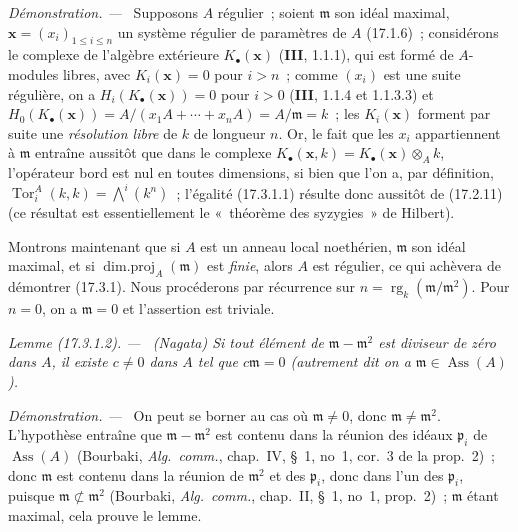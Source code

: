\documentclass[10pt,oneside]{book}
\makeatletter
\newcommand{\setmanualcurrentlabel}[1]{\def\@currentlabel{#1}}
\newcommand{\oldpage}[2][]{%
  \setcounter{footnote}{0}%
  \marginpar{\scriptsize\textbf{#1}~|~#2}\ignorespaces}
\newenvironment{lemma}[1][]{%
  \setmanualcurrentlabel{#1}\par\medskip\noindent\itshape Lemme (#1). ---\ }{\par}
\newenvironment{proof}{%
  \par\medskip\noindent\textit{Démonstration. ---\ }}{\par}
\makeatother
\begin{document}
\begin{proof}
Supposons $A$ régulier~; soient $\mathfrak{m}$ son idéal maximal,
$\mathbf{x}=(x_i)_{1\leq i\leq n}$ un système régulier de paramètres de $A$
(17.1.6)~; considérons le complexe de l'algèbre extérieure
$K_\bullet(\mathbf{x})$ (\textbf{III}, 1.1.1), qui est formé de $A$-modules
libres, avec $K_i(\mathbf{x})=0$ pour $i>n$~; comme $(x_i)$ est une suite
régulière, on a $H_i(K_\bullet(\mathbf{x}))=0$ pour $i>0$ (\textbf{III},
1.1.4 et 1.1.3.3) et
$H_0(K_\bullet(\mathbf{x}))=A/(x_1A+\cdots+x_nA)=A/\mathfrak{m}=k$~; les
$K_i(\mathbf{x})$ forment par suite une \emph{résolution libre} de $k$ de
longueur $n$. Or, le fait que les $x_i$ appartiennent à $\mathfrak{m}$
entraîne aussitôt que dans le complexe
$K_\bullet(\mathbf{x},k)=K_\bullet(\mathbf{x})\otimes_A k$, l'opérateur bord
est nul en toutes dimensions, si bien que l'on a, par définition,
$\operatorname{Tor}^A_i(k,k)=\bigwedge^i(k^n)$~; l'égalité (17.3.1.1) résulte
donc aussitôt de (17.2.11) (ce résultat est essentiellement le «~théorème des
syzygies~» de Hilbert).

Montrons maintenant que si $A$ est un anneau local noethérien,
$\mathfrak{m}$ son idéal maximal, et si
$\operatorname{dim.proj}_A(\mathfrak{m})$ est \emph{finie}, alors $A$ est
régulier, ce qui achèvera de démontrer (17.3.1). Nous procéderons par
récurrence sur $n=\operatorname{rg}_k(\mathfrak{m}/\mathfrak{m}^2)$. Pour
$n=0$, on a $\mathfrak{m}=0$ et l'assertion est triviale.
\end{proof}

\begin{lemma}[17.3.1.2]
\label{0.17.3.1.2-fr}
\textnormal{(Nagata)} Si tout élément de
$\mathfrak{m}-\mathfrak{m}^2$ est diviseur de zéro dans $A$, il existe
$c\neq0$ dans $A$ tel que $c\mathfrak{m}=0$ (autrement dit on a
$\mathfrak{m}\in\operatorname{Ass}(A)$).
\end{lemma}

\begin{proof}
On peut se borner au cas où $\mathfrak{m}\neq0$, donc
$\mathfrak{m}\neq\mathfrak{m}^2$. L'hypothèse entraîne que
$\mathfrak{m}-\mathfrak{m}^2$ est contenu dans la réunion des idéaux
$\mathfrak{p}_i$ de $\operatorname{Ass}(A)$ (Bourbaki,
\emph{Alg.~comm.}, chap.~IV, \S~1, no~1, cor.~3 de la prop.~2)~; donc
$\mathfrak{m}$ est contenu dans la réunion de $\mathfrak{m}^2$
\oldpage[0\textsubscript{IV-1}]{47}
et des $\mathfrak{p}_i$, donc dans l'un des $\mathfrak{p}_i$, puisque
$\mathfrak{m}\not\subset\mathfrak{m}^2$ (Bourbaki, \emph{Alg.~comm.},
chap.~II, \S~1, no~1, prop.~2)~; $\mathfrak{m}$ étant maximal, cela prouve le
lemme.
\end{proof}
\end{document}
